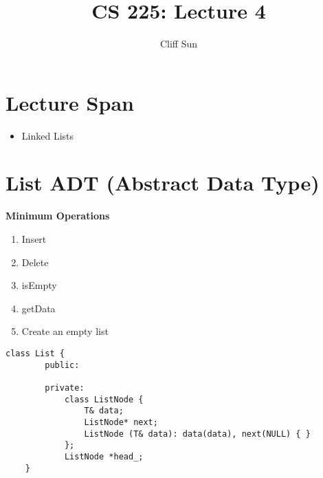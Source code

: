 \documentclass{article}
\title{CS 225: Lecture 4}
\author{Cliff Sun}
\newtheorem{one minute paper}[theorem]{One Minute Paper}
\begin{document}
\maketitle

\section*{Lecture Span}
\begin{itemize}
    \item Linked Lists
\end{itemize}

\section*{List ADT (Abstract Data Type)}

\textbf{Minimum Operations}
\begin{enumerate}
    \item Insert
    \item Delete
    \item isEmpty
    \item getData
    \item Create an empty list
\end{enumerate}

\begin{lstlisting}[caption=Linked List Class Example]
    class List {
        public:

        private:
            class ListNode {
                T& data;
                ListNode* next;
                ListNode (T& data): data(data), next(NULL) { }
            };
            ListNode *head_;
    }
    
\end{lstlisting}
\end{document}
